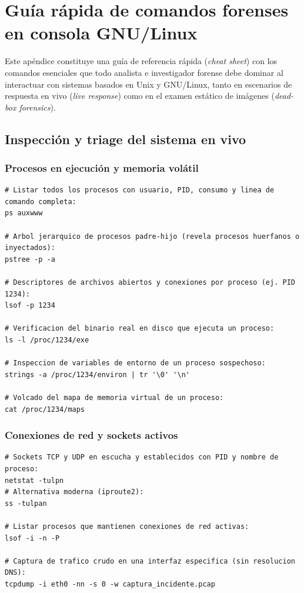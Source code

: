 \chapter{Guía rápida de comandos forenses en consola GNU/Linux}

Este apéndice constituye una guía de referencia rápida (\textit{cheat sheet}) con los comandos esenciales que todo analista e investigador forense debe dominar al interactuar con sistemas basados en Unix y GNU/Linux, tanto en escenarios de respuesta en vivo (\textit{live response}) como en el examen estático de imágenes (\textit{dead-box forensics}).

\section{Inspección y triage del sistema en vivo}

\subsection{Procesos en ejecución y memoria volátil}
\begin{lstlisting}[style=terminal]
# Listar todos los procesos con usuario, PID, consumo y linea de comando completa:
ps auxwww

# Arbol jerarquico de procesos padre-hijo (revela procesos huerfanos o inyectados):
pstree -p -a

# Descriptores de archivos abiertos y conexiones por proceso (ej. PID 1234):
lsof -p 1234

# Verificacion del binario real en disco que ejecuta un proceso:
ls -l /proc/1234/exe

# Inspeccion de variables de entorno de un proceso sospechoso:
strings -a /proc/1234/environ | tr '\0' '\n'

# Volcado del mapa de memoria virtual de un proceso:
cat /proc/1234/maps
\end{lstlisting}

\subsection{Conexiones de red y sockets activos}
\begin{lstlisting}[style=terminal]
# Sockets TCP y UDP en escucha y establecidos con PID y nombre de proceso:
netstat -tulpn
# Alternativa moderna (iproute2):
ss -tulpan

# Listar procesos que mantienen conexiones de red activas:
lsof -i -n -P

# Captura de trafico crudo en una interfaz especifica (sin resolucion DNS):
tcpdump -i eth0 -nn -s 0 -w captura_incidente.pcap
\end{lstlisting}

